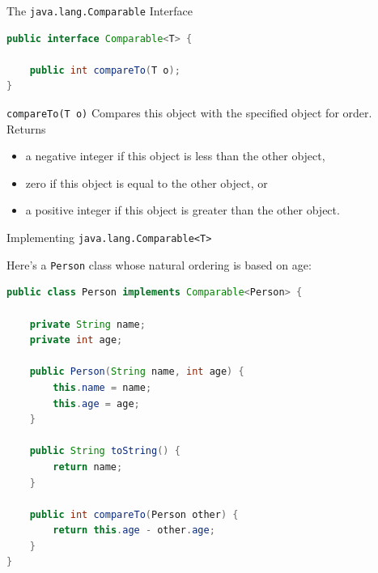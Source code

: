 \documentclass{beamer}
\begin{document}
\begin{frame}[fragile]{The {\tt java.lang.Comparable} Interface}


\begin{lstlisting}[language=Java]
public interface Comparable<T> {

    public int compareTo(T o);
}
\end{lstlisting}

{\tt compareTo(T o)} Compares this object with the specified object for order. Returns
\begin{itemize}
\item a negative integer if this object is less than the other object,
\item zero if this object is equal to the other object, or
\item a positive integer if this object is greater than the other object.
\end{itemize}

\end{frame}

\begin{frame}[fragile]{Implementing {\tt java.lang.Comparable<T>}}


Here's a {\tt Person} class whose natural ordering is based on age:
\begin{lstlisting}[language=Java]
public class Person implements Comparable<Person> {

    private String name;
    private int age;

    public Person(String name, int age) {
        this.name = name;
        this.age = age;
    }

    public String toString() {
        return name;
    }

    public int compareTo(Person other) {
        return this.age - other.age;
    }
}
\end{lstlisting}


\end{frame}
\end{document}
